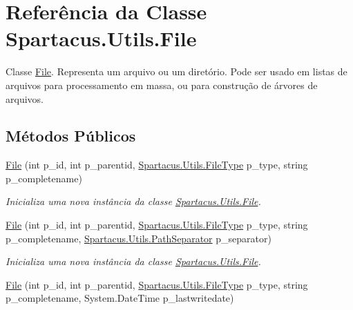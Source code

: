 \hypertarget{classSpartacus_1_1Utils_1_1File}{\section{Referência da Classe Spartacus.\+Utils.\+File}
\label{classSpartacus_1_1Utils_1_1File}
}


Classe \hyperlink{classSpartacus_1_1Utils_1_1File}{File}. Representa um arquivo ou um diretório. Pode ser usado em listas de arquivos para processamento em massa, ou para construção de árvores de arquivos.  


\subsection*{Métodos Públicos}
\begin{DoxyCompactItemize}
\item 
\hyperlink{classSpartacus_1_1Utils_1_1File_a950209a2d7a9ee1f916bd9a6c758ff61}{File} (int p\+\_\+id, int p\+\_\+parentid, \hyperlink{namespaceSpartacus_1_1Utils_a2bc44488e88db523cb2dcffaa6e77541}{Spartacus.\+Utils.\+File\+Type} p\+\_\+type, string p\+\_\+completename)
\begin{DoxyCompactList}\small\item\em Inicializa uma nova instância da classe \hyperlink{classSpartacus_1_1Utils_1_1File}{Spartacus.\+Utils.\+File}. \end{DoxyCompactList}\item 
\hyperlink{classSpartacus_1_1Utils_1_1File_a5b3e00eb2d4893662e61277db639851b}{File} (int p\+\_\+id, int p\+\_\+parentid, \hyperlink{namespaceSpartacus_1_1Utils_a2bc44488e88db523cb2dcffaa6e77541}{Spartacus.\+Utils.\+File\+Type} p\+\_\+type, string p\+\_\+completename, \hyperlink{namespaceSpartacus_1_1Utils_a9ee24558a33d60b42674bae3eed2a094}{Spartacus.\+Utils.\+Path\+Separator} p\+\_\+separator)
\begin{DoxyCompactList}\small\item\em Inicializa uma nova instância da classe \hyperlink{classSpartacus_1_1Utils_1_1File}{Spartacus.\+Utils.\+File}. \end{DoxyCompactList}\item 
\hyperlink{classSpartacus_1_1Utils_1_1File_aae915e7df02e86a2a2c4e53f91a20147}{File} (int p\+\_\+id, int p\+\_\+parentid, \hyperlink{namespaceSpartacus_1_1Utils_a2bc44488e88db523cb2dcffaa6e77541}{Spartacus.\+Utils.\+File\+Type} p\+\_\+type, string p\+\_\+completename, System.\+Date\+Time p\+\_\+lastwritedate)

\end{DoxyCompactItemize}
